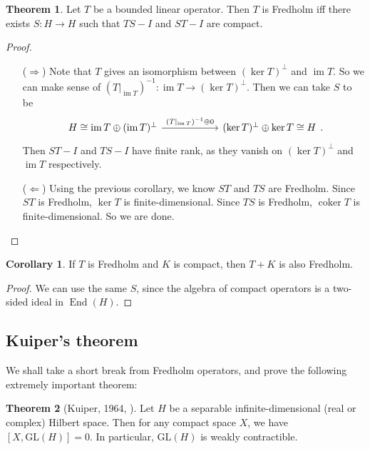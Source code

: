 \documentclass{shortart}
\theoremstyle{definition}
\newtheorem*{cor}{Corollary}
\newtheorem*{thm}{Theorem}
\DeclareMathOperator{\coker}{coker}
\DeclareMathOperator{\im}{im}
\DeclareMathOperator{\End}{End}
\newcommand\id{I}
\newcommand\GL{\mathrm{GL}}
\begin{document}
\begin{thm}
  Let $T$ be a bounded linear operator. Then $T$ is Fredholm iff there exists $S: H \to H$ such that $TS - \id $ and $ST - \id$ are compact.
\end{thm}

\begin{proof}\leavevmode
  \begin{itemize}
    \item[($\Rightarrow$)] Note that $T$ gives an isomorphism between $(\ker T)^\perp$ and $\im T$. So we can make sense of $(T|_{\im T})^{-1}: \im T \to (\ker T)^{\perp}$. Then we can take $S$ to be
      \[
        \begin{tikzcd}[column sep=2cm]
          H \cong \im T \oplus (\im T)^\perp \ar[r, "(T|_{\im T})^{-1} \oplus 0"] & (\ker T)^\perp \oplus \ker T \cong H
        \end{tikzcd}.
      \]
      Then $ST - I$ and $TS - I$ have finite rank, as they vanish on $(\ker T)^\perp$ and $\im T$ respectively.
    \item[($\Leftarrow$)] Using the previous corollary, we know $ST$ and $TS$ are Fredholm. Since $ST$ is Fredholm, $\ker T$ is finite-dimensional. Since $TS$ is Fredholm, $\coker T$ is finite-dimensional. So we are done.\qedhere
  \end{itemize}
\end{proof}

\begin{cor}
  If $T$ is Fredholm and $K$ is compact, then $T + K$ is also Fredholm.
\end{cor}

\begin{proof}
  We can use the same $S$, since the algebra of compact operators is a two-sided ideal in $\End(H)$.
\end{proof}

\subsection{Kuiper's theorem}
We shall take a short break from Fredholm operators, and prove the following extremely important theorem:
\begin{thm}[Kuiper, 1964, \cite{kuiper196519}]
  Let $H$ be a separable infinite-dimensional (real or complex) Hilbert space. Then for any compact space $X$, we have $[X, \GL(H)] = 0$. In particular, $\GL(H)$ is weakly contractible.
\end{thm}
\end{document}
